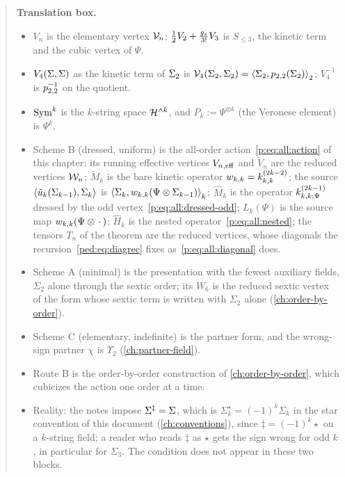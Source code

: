 \begin{quote}
  \small
  \textbf{Translation box.}
  \begin{itemize}
    \setlength{\itemsep}{0.3ex}

    \item $V_n$ is the elementary vertex $\vertex{n}$; $\tfrac12 V_2 + \tfrac{\gs}{3!} V_3$ is $S_{\le 3}$, the kinetic term and the cubic vertex of $\Psi$.

    \item $V_4(\Sig, \Sig)$ as the kinetic term of $\Sig_2$ is $\vertex{4}(\Sigma_2, \Sigma_2) = \pair[2]{\Sigma_2}{\sprod{2}{2}(\Sigma_2)}$; $V_4^{-1}$ is $\sprod{2}{2}^{-1}$ on the quotient.

    \item $\Sym^k$ is the $k$-string space $\Hn{k}$, and $P_k := \Psi^{\otimes k}$ (the Veronese element) is $\Psi^k$.

    \item Scheme B (dressed, uniform) is the all-order action~\eqref{p:eq:all:action} of this chapter: its running effective vertices $V_{n, \rm eff}$ and $\tilde V_n$ are the reduced vertices $\dvertex{n}$; $\tilde M_k$ is the bare kinetic operator $\wprod{k}{k} = \kin{k}{}{2 k - 2}$; the source $\Mean{\tilde u_k(\Sig_{k - 1}), \Sig_k}$ is $\pair[k]{\Sigma_k}{\wprod{k}{k}(\Psi \otimes \Sigma_{k - 1})}$; $\hat M_k$ is the operator $\kin{k}{\Psi}{2 k - 1}$ dressed by the odd vertex~\eqref{p:eq:all:dressed-odd}; $L_k(\Psi)$ is the source map $\wprod{k}{k}(\Psi \otimes \, \cdot \,)$; $\hat H_k$ is the nested operator~\eqref{p:eq:all:nested}; the tensors $T_n$ of the theorem are the reduced vertices, whose diagonals the recursion~\eqref{ped:eq:diagrec} fixes as~\eqref{p:eq:all:diagonal} does.

    \item Scheme A (minimal) is the presentation with the fewest auxiliary fields, $\Sigma_2$ alone through the sextic order; its $W_6$ is the reduced sextic vertex of the form whose sextic term is written with $\Sigma_2$ alone (\cref{ch:order-by-order}).

    \item Scheme C (elementary, indefinite) is the partner form, and the wrong-sign partner $\chi$ is $\Upsilon_2$ (\cref{ch:partner-field}).

    \item Route B is the order-by-order construction of \cref{ch:order-by-order}, which cubicizes the action one order at a time.

    \item Reality: the notes impose $\Sig^\ddagger = \Sig$, which is $\Sigma_k^\star = (-1)^k \Sigma_k$ in the star convention of this document (\cref{ch:conventions}), since $\ddagger = (-1)^k \star$ on a $k$-string field; a reader who reads $\ddagger$ as $\star$ gets the sign wrong for odd $k$, in particular for $\Sigma_3$.
      The condition does not appear in these two blocks.
  \end{itemize}
\end{quote}

